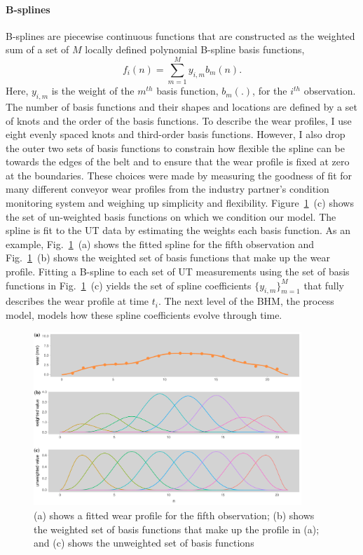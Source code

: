 \paragraph{B-splines}
B-splines are piecewise continuous functions \citep[p. 33-38]{ramsay_2009} that are constructed as the weighted sum of a set of $M$ locally defined polynomial B-spline basis functions,
\begin{equation}
 f_i(n) = \sum_{m = 1}^{M} y_{i, m}b_m(n).
  \label{eq:spline}
\end{equation}
Here, $y_{i, m}$ is the weight of the $m^{th}$ basis function, $b_m(.)$, for the $i^{th}$ observation. The number of basis functions and their shapes and locations are defined by a set of knots and the order of the basis functions. To describe the wear profiles, I use eight evenly spaced knots and third-order basis functions. However, I also drop the outer two sets of basis functions to constrain how flexible the spline can be towards the edges of the belt and to ensure that the wear profile is fixed at zero at the boundaries. These choices were made by measuring the goodness of fit for many different conveyor wear profiles from the industry partner's condition monitoring system and weighing up simplicity and flexibility. Figure~\ref{fig:basis-functions}~(c) shows the set of un-weighted basis functions on which we condition our model. The spline is fit to the UT data by estimating the weights each basis function. As an example, Fig.~\ref{fig:basis-functions}~(a) shows the fitted spline for the fifth observation and Fig.~\ref{fig:basis-functions}~(b) shows the weighted set of basis functions that make up the wear profile. Fitting a B-spline to each set of UT measurements using the set of basis functions in Fig.~\ref{fig:basis-functions}~(c) yields the set of spline coefficients $\{y_{i, m}\}^M_{m = 1}$ that fully describes the wear profile at time $t_i$. The next level of the BHM, the process model, models how these spline coefficients evolve through time.

\begin{figure}[h]
  \centering
  \includegraphics[width=0.9\textwidth]{figures/ch-6/b-spline-fitting.pdf}
  \caption{(a) shows a fitted wear profile for the fifth observation; (b) shows the weighted set of basis functions that make up the profile in (a); and (c) shows the unweighted set of basis functions}
  \label{fig:basis-functions}
\end{figure}

